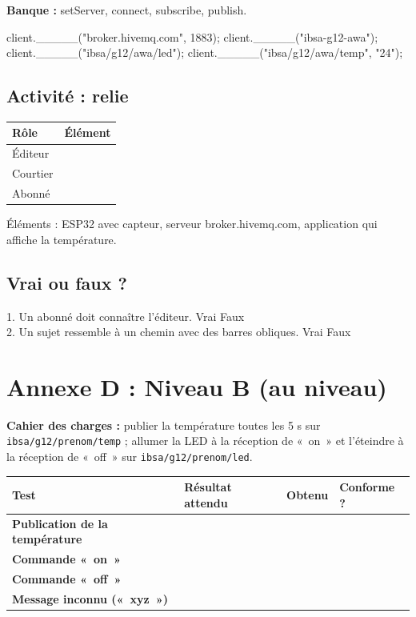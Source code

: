 \documentclass[11pt,a4paper]{article}
\begin{document}
\textbf{Banque :} setServer, connect, subscribe, publish.

\begin{arduino}
client._____("broker.hivemq.com", 1883);
client._____("ibsa-g12-awa");
client._____("ibsa/g12/awa/led");
client._____("ibsa/g12/awa/temp", "24");
\end{arduino}

\subsection*{Activité : relie}
\begin{tabularx}{\linewidth}{Y Y}
\toprule
\textbf{Rôle} & \textbf{Élément}\\
\midrule
Éditeur & \\
Courtier & \\
Abonné & \\
\bottomrule
\end{tabularx}
Éléments : ESP32 avec capteur, serveur broker.hivemq.com, application qui affiche la température.

\subsection*{Vrai ou faux ?}
1. Un abonné doit connaître l'éditeur. \cb Vrai \cb Faux\\
2. Un sujet ressemble à un chemin avec des barres obliques. \cb Vrai \cb Faux

\newpage
\section*{Annexe D : Niveau B (au niveau)}

\textbf{Cahier des charges :} publier la température toutes les 5 s sur \texttt{ibsa/g12/prenom/temp} ; allumer la LED à la réception de «~on~» et l'éteindre à la réception de «~off~» sur \texttt{ibsa/g12/prenom/led}.

\begin{tabularx}{\linewidth}{>{\bfseries}p{4cm}Y Y Y}
\toprule
Test & Résultat attendu & Obtenu & Conforme ?\\
\midrule
Publication de la température & & & \\
Commande «~on~» & & & \\
Commande «~off~» & & & \\
Message inconnu («~xyz~») & & & \\
\bottomrule
\end{tabularx}
\end{document}
